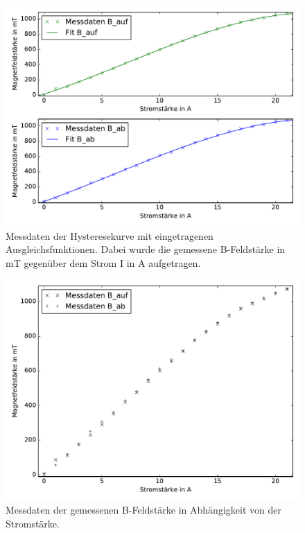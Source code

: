 \begin{figure}[h]
  \centering
  \includegraphics[width=\textwidth]{Python/Hysterese.pdf}
  \caption{Messdaten der Hysteresekurve mit eingetragenen Ausgleichsfunktionen.
  Dabei wurde die gemessene B-Feldstärke in mT gegenüber dem Strom I in A aufgetragen.}
  \label{fig:Hysterese}
\end{figure}

\begin{figure}[h]
  \centering
  \includegraphics[width=\textwidth]{Python/Hysterese_Messdaten.pdf}
  \caption{Messdaten der gemessenen B-Feldstärke in Abhängigkeit von der Stromstärke.}
  \label{fig:Hysterese_Messdaten}
\end{figure}


